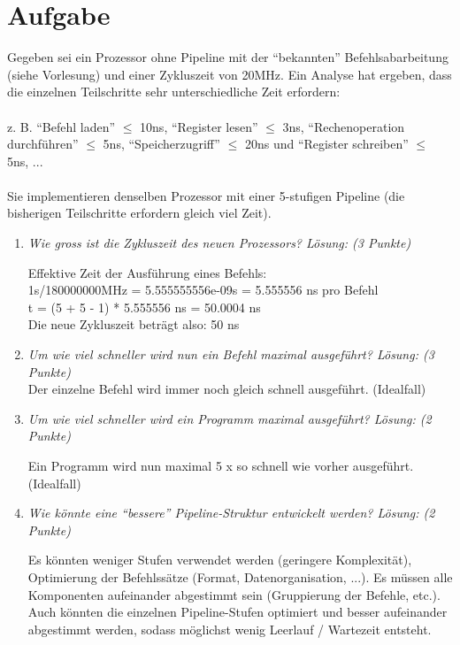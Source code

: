 \documentclass[10pt]{article}
\begin{document}
\section{Aufgabe}
Gegeben sei ein Prozessor ohne Pipeline mit der "`bekannten"' Befehlsabarbeitung (siehe Vorlesung) und einer Zykluszeit von 20MHz. Ein Analyse hat ergeben, dass die einzelnen Teilschritte sehr unterschiedliche Zeit erfordern:\\\\
z. B. "`Befehl laden"' $\leq$ 10ns, "`Register lesen"' $\leq$ 3ns, "`Rechenoperation durchführen"' $\leq$ 5ns, "`Speicherzugriff"' $\leq$ 20ns und "`Register schreiben"' $\leq$ 5ns, ... \\\\
Sie implementieren denselben Prozessor mit einer 5-stufigen Pipeline (die bisherigen Teilschritte erfordern gleich viel Zeit). 
\begin{enumerate}[label=\alph*)]
	\item 
	\textit{Wie gross ist die Zykluszeit des neuen Prozessors? Lösung: (3 Punkte) } 
	
	Effektive Zeit der Ausführung eines Befehls:\\
	1s/180000000MHz = 5.555555556e-09s = 5.555556 ns pro Befehl\\
	t = (5 + 5 - 1) * 5.555556 ns = 50.0004 ns\\
	Die neue Zykluszeit beträgt also: 50 ns
	

	\item 
	\textit{Um wie viel schneller wird nun ein Befehl maximal ausgeführt? Lösung: (3 Punkte)} \\
	Der einzelne Befehl wird immer noch gleich schnell ausgeführt. (Idealfall)	
	\item 
	\textit{Um wie viel schneller wird ein Programm maximal ausgeführt? Lösung: (2 Punkte) }
	
	Ein Programm wird nun maximal 5 x so schnell wie vorher ausgeführt. (Idealfall)
	\item 
	\textit{Wie	könnte eine "`bessere"' Pipeline-Struktur entwickelt werden? Lösung: (2 Punkte)  } 
	
	Es könnten weniger Stufen verwendet werden (geringere Komplexität), Optimierung der Befehlssätze (Format, Datenorganisation, ...). Es müssen alle Komponenten aufeinander abgestimmt sein (Gruppierung der Befehle, etc.). Auch könnten die einzelnen Pipeline-Stufen optimiert und besser aufeinander abgestimmt werden, sodass möglichst wenig Leerlauf / Wartezeit entsteht.	
\end{enumerate}
\end{document}
